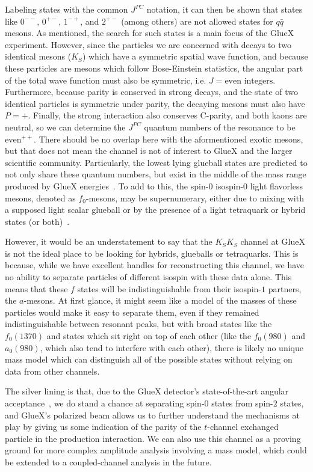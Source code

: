 Labeling states with the common $J^{PC}$ notation, it can then be shown that states like $0^{--}$, $0^{+-}$, $1^{-+}$, and $2^{+-}$ (among others) are not allowed states for $q\bar{q}$ mesons. As mentioned, the search for such states is a main focus of the GlueX experiment. However, since the particles we are concerned with decays to two identical mesons ($K_S$) which have a symmetric spatial wave function, and because these particles are mesons which follow Bose-Einstein statistics, the angular part of the total wave function must also be symmetric, i.e. $J = \text{even integers}$. Furthermore, because parity is conserved in strong decays, and the state of two identical particles is symmetric under parity, the decaying mesons must also have $P=+$. Finally, the strong interaction also conserves C-parity, and both kaons are neutral, so we can determine the $J^{PC}$ quantum numbers of the resonance to be $\text{even}^{++}$. There should be no overlap here with the aformentioned exotic mesons, but that does not mean the channel is not of interest to GlueX and the larger scientific community. Particularly, the lowest lying glueball states are predicted to not only share these quantum numbers, but exist in the middle of the mass range produced by GlueX energies~\cite{Morningstar1999}. To add to this, the spin-$0$ isospin-$0$ light flavorless mesons, denoted as $f_0$-mesons, may be supernumerary, either due to mixing with a supposed light scalar glueball or by the presence of a light tetraquark or hybrid states (or both)~\cite{Zyla2020}.

However, it would be an understatement to say that the $K_SK_S$ channel at GlueX is not the ideal place to be looking for hybrids, glueballs or tetraquarks. This is because, while we have excellent handles for reconstructing this channel, we have no ability to separate particles of different isospin with these data alone. This means that these $f$ states will be indistinguishable from their isospin-$1$ partners, the $a$-mesons. At first glance, it might seem like a model of the masses of these particles would make it easy to separate them, even if they remained indistinguishable between resonant peaks, but with broad states like the $f_0(1370)$ and states which sit right on top of each other (like the $f_0(980)$ and $a_0(980)$, which also tend to interfere with each other), there is likely no unique mass model which can distinguish all of the possible states without relying on data from other channels.

The silver lining is that, due to the GlueX detector's state-of-the-art angular acceptance~\cite{Adhikari2021}, we do stand a chance at separating spin-$0$ states from spin-$2$ states, and GlueX's polarized beam allows us to further understand the mechanisms at play by giving us some indication of the parity of the $t$-channel exchanged particle in the production interaction. We can also use this channel as a proving ground for more complex amplitude analysis involving a mass model, which could be extended to a coupled-channel analysis in the future.


